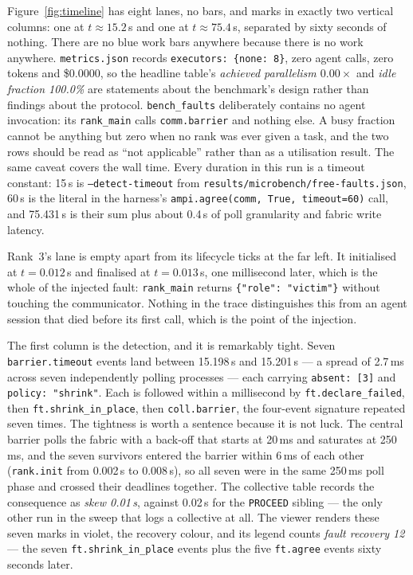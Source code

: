 \documentclass[11pt]{article}
\begin{document}
Figure~\ref{fig:timeline} has eight lanes, no bars, and marks in exactly two vertical
columns: one at $t\approx15.2$\,s and one at $t\approx75.4$\,s, separated by sixty
seconds of nothing. There are no blue work bars anywhere because there is no work
anywhere. \texttt{metrics.json} records \texttt{executors:\ \{none: 8\}}, zero agent
calls, zero tokens and \$0.0000, so the headline table's \emph{achieved parallelism
$0.00\times$} and \emph{idle fraction 100.0\%} are statements about the benchmark's
design rather than findings about the protocol. \texttt{bench\_faults} deliberately
contains no agent invocation: its \texttt{rank\_main} calls \texttt{comm.barrier} and
nothing else. A busy fraction cannot be anything but zero when no rank was ever given a
task, and the two rows should be read as ``not applicable'' rather than as a
utilisation result. The same caveat covers the wall time. Every duration in this run is
a timeout constant: 15\,s is \texttt{--detect-timeout} from
\texttt{results/microbench/free-faults.json}, 60\,s is the literal in the harness's
\texttt{ampi.agree(comm, True, timeout=60)} call, and 75.431\,s is their sum plus about
0.4\,s of poll granularity and fabric write latency.

Rank~3's lane is empty apart from its lifecycle ticks at the far left. It initialised at
$t=0.012$\,s and finalised at $t=0.013$\,s, one millisecond later, which is the whole of
the injected fault: \texttt{rank\_main} returns \texttt{\{"role": "victim"\}} without
touching the communicator. Nothing in the trace distinguishes this from an agent session
that died before its first call, which is the point of the injection.

The first column is the detection, and it is remarkably tight. Seven
\texttt{barrier.timeout} events land between 15.198\,s and 15.201\,s --- a spread of
2.7\,ms across seven independently polling processes --- each carrying
\texttt{absent:\ [3]} and \texttt{policy:\ "shrink"}. Each is followed within a
millisecond by \texttt{ft.declare\_failed}, then \texttt{ft.shrink\_in\_place}, then
\texttt{coll.barrier}, the four-event signature repeated seven times. The tightness is
worth a sentence because it is not luck. The central barrier polls the fabric with a
back-off that starts at 20\,ms and saturates at 250\,ms, and the seven survivors entered
the barrier within 6\,ms of each other (\texttt{rank.init} from 0.002\,s to 0.008\,s), so
all seven were in the same 250\,ms poll phase and crossed their deadlines together. The
collective table records the consequence as \emph{skew 0.01\,s}, against 0.02\,s for the
\texttt{PROCEED} sibling --- the only other run in the sweep that logs a collective at
all. The viewer
renders these seven marks in violet, the recovery colour, and its legend counts
\emph{fault recovery 12} --- the seven \texttt{ft.shrink\_in\_place} events plus the five
\texttt{ft.agree} events sixty seconds later.
\end{document}
